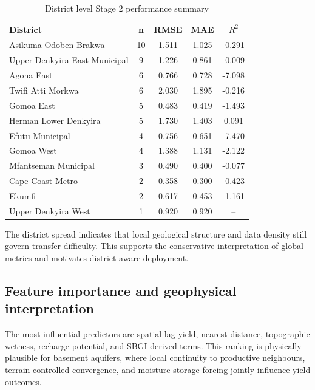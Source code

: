 \documentclass[preprint,12pt]{elsarticle}
\begin{document}
\begin{table}[h]
\centering
\caption{District level Stage 2 performance summary}
\label{tab:districtsummary}
\begin{tabular}{lcccc}
\toprule
District & n & RMSE & MAE & $R^2$ \\
\midrule
Asikuma Odoben Brakwa & 10 & 1.511 & 1.025 & -0.291 \\
Upper Denkyira East Municipal & 9 & 1.226 & 0.861 & -0.009 \\
Agona East & 6 & 0.766 & 0.728 & -7.098 \\
Twifi Atti Morkwa & 6 & 2.030 & 1.895 & -0.216 \\
Gomoa East & 5 & 0.483 & 0.419 & -1.493 \\
Herman Lower Denkyira & 5 & 1.730 & 1.403 & 0.091 \\
Efutu Municipal & 4 & 0.756 & 0.651 & -7.470 \\
Gomoa West & 4 & 1.388 & 1.131 & -2.122 \\
Mfantseman Municipal & 3 & 0.490 & 0.400 & -0.077 \\
Cape Coast Metro & 2 & 0.358 & 0.300 & -0.423 \\
Ekumfi & 2 & 0.617 & 0.453 & -1.161 \\
Upper Denkyira West & 1 & 0.920 & 0.920 & -- \\
\bottomrule
\end{tabular}
\end{table}

The district spread indicates that local geological structure and data density still govern transfer difficulty. This supports the conservative interpretation of global metrics and motivates district aware deployment.

\subsection{Feature importance and geophysical interpretation}
The most influential predictors are spatial lag yield, nearest distance, topographic wetness, recharge potential, and SBGI derived terms. This ranking is physically plausible for basement aquifers, where local continuity to productive neighbours, terrain controlled convergence, and moisture storage forcing jointly influence yield outcomes.
\end{document}
